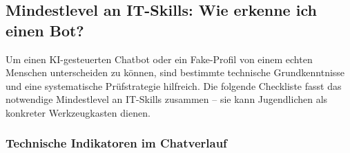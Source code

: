 \documentclass[12pt,a4paper,oneside]{scrartcl}
\begin{document}
	\subsection{Mindestlevel an IT-Skills: Wie erkenne ich einen Bot?}
	
	Um einen KI-gesteuerten Chatbot oder ein Fake-Profil von einem echten Menschen unterscheiden zu können, sind bestimmte technische Grundkenntnisse und eine systematische Prüfstrategie hilfreich. Die folgende Checkliste fasst das notwendige Mindestlevel an IT-Skills zusammen – sie kann Jugendlichen als konkreter Werkzeugkasten dienen.
	
	\subsubsection{Technische Indikatoren im Chatverlauf}
	
\end{document}
